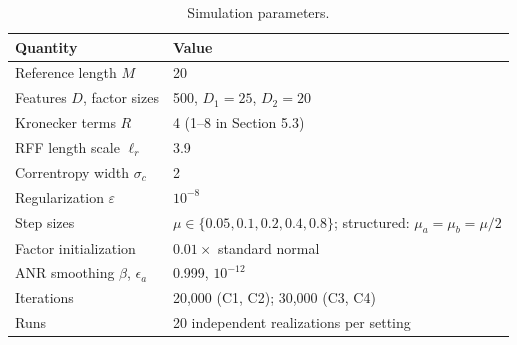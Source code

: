\documentclass[preprint,12pt]{elsarticle}
\begin{document}
\begin{table}[htbp]
\centering
\small
\caption{Simulation parameters.}
\begin{tabularx}{\linewidth}{@{}lX@{}}
\toprule
Quantity & Value \\
\midrule
Reference length $M$ & 20 \\
Features $D$, factor sizes & 500, $D_1 = 25$, $D_2 = 20$ \\
Kronecker terms $R$ & 4 (1–8 in Section 5.3) \\
RFF length scale $\ell_r$ & 3.9 \\
Correntropy width $\sigma_c$ & 2 \\
Regularization $\varepsilon$ & $10^{-8}$ \\
Step sizes & $\mu \in \{0.05, 0.1, 0.2, 0.4, 0.8\}$; structured: $\mu_a = \mu_b = \mu/2$ \\
Factor initialization & $0.01 \times$ standard normal \\
ANR smoothing $\beta$, $\epsilon_a$ & 0.999, $10^{-12}$ \\
Iterations & 20,000 (C1, C2); 30,000 (C3, C4) \\
Runs & 20 independent realizations per setting \\
\bottomrule
\end{tabularx}
\end{table}
\end{document}
